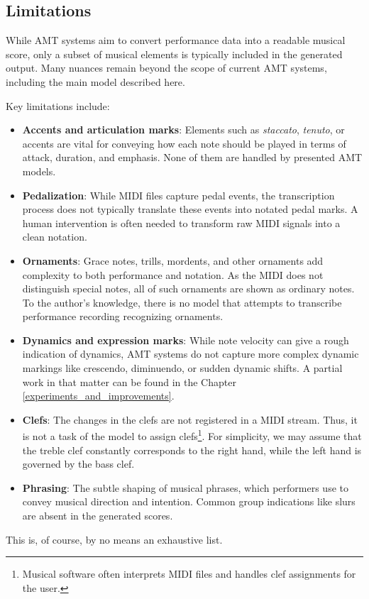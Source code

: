 \subsection{Limitations}

While AMT systems aim to convert performance data into a readable musical score, only a subset of musical elements is typically included in the generated output. Many nuances remain beyond the scope of current AMT systems, including the main model described here.

Key limitations include: \begin{itemize}
	\item {\bf Accents and articulation marks}: Elements such as \emph{staccato}, \emph{tenuto}, or accents are vital for conveying how each note should be played in terms of attack, duration, and emphasis. None of them are handled by presented AMT models.
	\item {\bf Pedalization}: While MIDI files capture pedal events, the transcription process does not typically translate these events into notated pedal marks. A human intervention is often needed to transform raw MIDI signals into a clean notation.
	\item {\bf Ornaments}: Grace notes, trills, mordents, and other ornaments add complexity to both performance and notation. As the MIDI does not distinguish special notes, all of such ornaments are shown as ordinary notes. To the author's knowledge, there is no model that attempts to transcribe performance recording recognizing ornaments.
	\item {\bf Dynamics and expression marks}: While note velocity can give a rough indication of dynamics, AMT systems do not capture more complex dynamic markings like crescendo, diminuendo, or sudden dynamic shifts. A partial work in that matter can be found in the Chapter \ref{experiments_and_improvements}.
	\item {\bf Clefs}: The changes in the clefs are not registered in a MIDI stream. Thus, it is not a task of the model to assign clefs\footnote{Musical software often interprets MIDI files and handles clef assignments for the user. \missing}. For simplicity, we may assume that the treble clef constantly corresponds to the right hand, while the left hand is governed by the bass clef.
	\item {\bf Phrasing}: The subtle shaping of musical phrases, which performers use to convey musical direction and intention. Common group indications like slurs are absent in the generated scores. \end{itemize}

This is, of course, by no means an exhaustive list.
